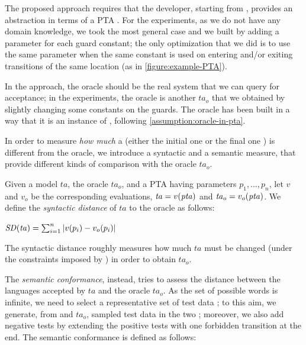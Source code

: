 \begin{tikzborder}{\cite{Gargantini16:validation}}
\begin{tikzborder}{\cite{gargantini_combinatorial_2017}}
\begin{tikzborder}{\cite{garn2019}}
\begin{tikzborder}{\cite{arcaini2019achieving}}
\begin{tikzborder}{\cite{arcaini2019varivolution}}
\begin{tikzborder}{}
\bb The proposed approach requires that the developer, starting from \initTa, provides an abstraction in terms of a PTA \ptaProc. For the experiments, as we do not have any domain knowledge, we took the most general case and we built \ptaProc by adding a parameter for each guard constant; the only optimization that we did is to use the same parameter when the same constant is used on entering and/or exiting transitions of the same location (as in \ref{figure:example-PTA}).

In the approach, the oracle should be the real system that we can query for acceptance; in the experiments, the oracle is another \ta $\mathit{ta}_o$ that we obtained by slightly changing some constants on the guards. The oracle has been built in a way that it is an instance of \ptaProc, following \ref{assumption:oracle-in-pta}.

In order to measure {\it how much} a \ta (either the initial one \initTa or the final one \repTa) is different from the oracle, we introduce a syntactic and a semantic measure, that provide different kinds of comparison with the oracle $\mathit{ta}_o$.

Given a model $\mathit{ta}$, the oracle $\mathit{ta}_o$, and a PTA \ptaProc having parameters $p_1, \ldots, p_n$, let $v$ and $v_o$ be the corresponding evaluations, \ie{} $\mathit{ta} = v(\mathit{pta})$ and $\mathit{ta}_o = v_o(\mathit{pta})$. We define the \textit{syntactic distance} of $\mathit{ta}$ to the oracle as follows:\be

\vspace{4pt}
\centerline{
	$\mathit{SD}(\mathit{ta}) = \sum_{i=1}^{n} |v(p_i) - v_o(p_i)|$}
\vspace{4pt}

\bb \noindent The syntactic distance roughly measures how much $\mathit{ta}$ must be changed (under the constraints imposed by \ptaProc) in order to obtain $\mathit{ta}_o$.

The {\it semantic conformance}, instead, tries to assess the distance between the languages accepted by $\mathit{ta}$ and the oracle $\mathit{ta}_o$. As the set of possible words is infinite, we need to select a representative set of test data \testDataConf;
to this aim, we generate, from \initTa and $\mathit{ta}_o$, sampled test data %
in the two \tas;
moreover, we also add negative tests by extending the positive tests with one forbidden transition at the end.
The semantic conformance is defined as follows:\be


\end{tikzborder}
\end{tikzborder}
\end{tikzborder}
\end{tikzborder}
\end{tikzborder}
\end{tikzborder}
